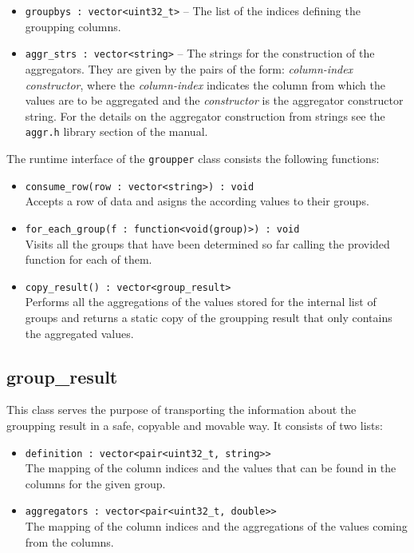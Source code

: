 	\begin{itemize}
		\item \texttt{groupbys : vector<uint32\_t>} -- The list of the
			indices defining the groupping columns.
		\item \texttt{aggr\_strs : vector<string>} -- The strings for
			the construction of the aggregators. They are given by
			the pairs of the form: \textit{column-index constructor},
			where the \textit{column-index} indicates the column from
			which the values are to be aggregated and the
			\textit{constructor} is the aggregator constructor string.
			For the details on the aggregator construction from strings
			see the \texttt{aggr.h} library section of the manual.
	\end{itemize}

	The runtime interface of the \texttt{groupper} class consists the following
	functions:

	\begin{itemize}
		\item \texttt{consume\_row(row : vector<string>) : void}\\
			Accepts a row of data and asigns the according values to
			their groups.
		\item \texttt{for\_each\_group(f : function<void(group)>) : void}\\
			Visits all the groups that have been determined so far
			calling the provided function for each of them.
		\item \texttt{copy\_result() : vector<group\_result>}\\
			Performs all the aggregations of the values stored for the
			internal list of groups and returns a static copy of
			the groupping result that only contains the aggregated
			values.
	\end{itemize}

	\subsection{group\_result}
	This class serves the purpose of transporting the
	information about the groupping result in a safe, copyable and movable
	way. It consists of two lists:

	\begin{itemize}
		\item \texttt{definition : vector<pair<uint32\_t, string>>}\\
			The mapping of the column indices and the values that
			can be found in the columns for the given group.
		\item \texttt{aggregators : vector<pair<uint32\_t, double>>}\\
			The mapping of the column indices and the aggregations
			of the values coming from the columns.
	\end{itemize}


